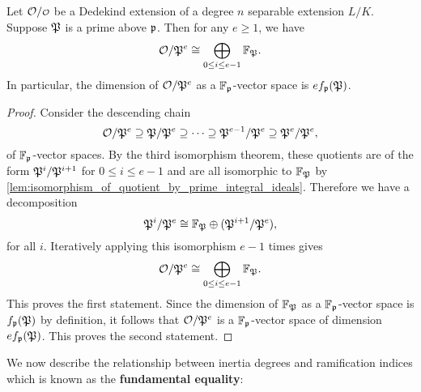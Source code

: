     \begin{lemma}\label{lem:quotient_by_prime_power_isomorphism}
      Let $\mc{O}/\smc{O}$ be a Dedekind extension of a degree $n$ separable extension $L/K$. Suppose $\mathfrak{P}$ is a prime above $\mathfrak{p}$. Then for any $e \ge 1$, we have
      \[
        \mathcal{O}/\mathfrak{P}^{e} \cong \bigoplus_{0 \le i \le e-1}\mathbb{F}_{\mathfrak{P}}.
      \]
      In particular, the dimension of $\mathcal{O}/\mathfrak{P}^{e}$ as a $\mathbb{F}_{\mathfrak{p}}$-vector space is $ef_{\mathfrak{p}}(\mathfrak{P})$.
    \end{lemma}
    \begin{proof}
      Consider the descending chain
      \[
        \mathcal{O}/\mathfrak{P}^{e} \supseteq \mathfrak{P}/\mathfrak{P}^{e} \supseteq \cdots \supseteq \mathfrak{P}^{e-1}/\mathfrak{P}^{e} \supseteq \mathfrak{P}^{e}/\mathfrak{P}^{e},
      \]
      of $\mathbb{F}_{\mathfrak{p}}$-vector spaces. By the third isomorphism theorem, these quotients are of the form $\mathfrak{P}^{i}/\mathfrak{P}^{i+1}$ for $0 \le i \le e-1$ and are all isomorphic to $\mathbb{F}_{\mathfrak{P}}$ by \cref{lem:isomorphism_of_quotient_by_prime_integral_ideals}. Therefore we have a decomposition
      \[
        \mathfrak{P}^{i}/\mathfrak{P}^{e} \cong \mathbb{F}_{\mathfrak{P}} \oplus (\mathfrak{P}^{i+1}/\mathfrak{P}^{e}),
      \]
      for all $i$. Iteratively applying this isomorphism $e-1$ times gives
      \[
        \mathcal{O}/\mathfrak{P}^{e} \cong \bigoplus_{0 \le i \le e-1}\mathbb{F}_{\mathfrak{P}}.
      \]
      This proves the first statement. Since the dimension of $\mathbb{F}_{\mathfrak{P}}$ as a $\mathbb{F}_{\mathfrak{p}}$-vector space is $f_{\mathfrak{p}}(\mathfrak{P})$ by definition, it follows that $\mathcal{O}/\mathfrak{P}^{e}$ is a $\mathbb{F}_{\mathfrak{p}}$-vector space of dimension $ef_{\mathfrak{p}}(\mathfrak{P})$. This proves the second statement.
    \end{proof}
    
    We now describe the relationship between inertia degrees and ramification indices which is known as the \textbf{fundamental equality}:


